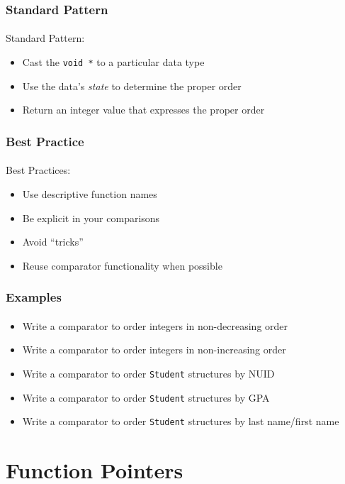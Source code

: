 \documentclass[]{beamer}
\begin{document}
\begin{frame}[fragile]
  \frametitle{Standard Pattern}
  \framesubtitle{}

Standard Pattern:
\begin{itemize}[<+->]
  \item Cast the \texttt{void *} to a particular data type
  \item Use the data's \emph{state} to determine the proper order
  \item Return an integer value that expresses the proper order 
\end{itemize}

\end{frame}

\begin{frame}[fragile]
  \frametitle{Best Practice}
  \framesubtitle{}

Best Practices:
\begin{itemize}[<+->]
  \item Use descriptive function names
  \item Be explicit in your comparisons
  \item Avoid ``tricks''
  \item Reuse comparator functionality when possible
\end{itemize}

\end{frame}

\begin{frame}[fragile]
  \frametitle{Examples}
  \framesubtitle{}

\begin{itemize}
  \item Write a comparator to order integers in non-decreasing order
  \item Write a comparator to order integers in non-increasing order
  \item Write a comparator to order \texttt{Student} structures by NUID
  \item Write a comparator to order \texttt{Student} structures by GPA
  \item Write a comparator to order \texttt{Student} structures by last name/first name
\end{itemize}

\end{frame}

\section{Function Pointers}
\end{document}
